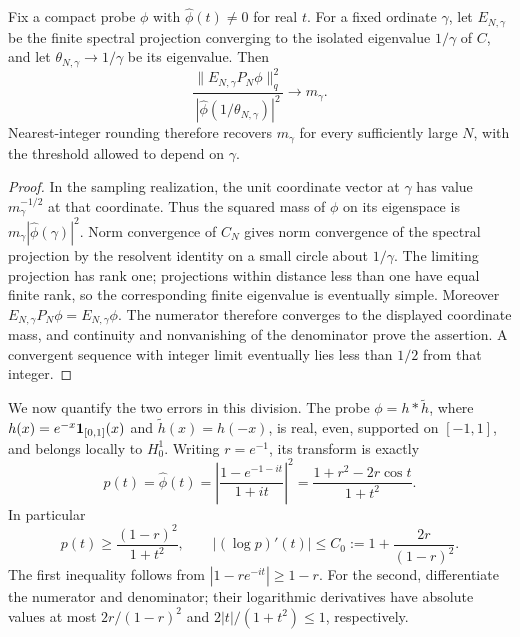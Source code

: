 \begin{remark}
\label{rem:suzuki-multiplicity}
Fix a compact probe $\phi$ with $\widehat\phi(t)\ne0$ for real $t$.
For a fixed ordinate $\gamma$, let $E_{N,\gamma}$ be the finite spectral
projection converging to the isolated eigenvalue $1/\gamma$ of $C$, and
let $\theta_{N,\gamma}\to1/\gamma$ be its eigenvalue. Then
\[
 \frac{\|E_{N,\gamma}P_N\phi\|_q^2}
      {|\widehat\phi(1/\theta_{N,\gamma})|^2}
           \longrightarrow m_\gamma.
\]
Nearest-integer rounding therefore recovers $m_\gamma$ for every
sufficiently large $N$, with the threshold allowed to depend on $\gamma$.
\end{remark}

\begin{proof}
In the sampling realization, the unit coordinate vector at $\gamma$ has
value $m_\gamma^{-1/2}$ at that coordinate. Thus the squared mass of
$\phi$ on its eigenspace is
$m_\gamma|\widehat\phi(\gamma)|^2$. Norm convergence of $C_N$ gives
norm convergence of the spectral projection by the resolvent identity
on a small circle about $1/\gamma$. The limiting projection has rank
one; projections within distance less than one have equal finite rank,
so the corresponding finite eigenvalue is eventually simple.
Moreover $E_{N,\gamma}P_N\phi=E_{N,\gamma}\phi$.
The numerator therefore converges to the displayed coordinate mass,
and continuity and nonvanishing of the denominator prove the assertion.
A convergent sequence with integer limit eventually lies less than
$1/2$ from that integer.
\end{proof}

We now quantify the two errors in this division. The probe
$\phi=h*\widetilde h$, where
$h(x)=e^{-x}{\bf1}_{[0,1]}(x)$ and $\widetilde h(x)=h(-x)$, is real,
even, supported on $[-1,1]$, and belongs locally to $H^1_0$.
Writing $r=e^{-1}$, its transform is exactly
\[
 p(t)=\widehat\phi(t)
 =\left|\frac{1-e^{-1-it}}{1+it}\right|^2
 =\frac{1+r^2-2r\cos t}{1+t^2}.
\]
In particular
\begin{equation}
 p(t)\ge\frac{(1-r)^2}{1+t^2},\qquad
 |(\log p)'(t)|\le C_0:=1+\frac{2r}{(1-r)^2}.
 \label{eq:probe-bounds}
\end{equation}
The first inequality follows from $|1-re^{-it}|\ge1-r$. For the
second, differentiate the numerator and denominator; their logarithmic
derivatives have absolute values at most $2r/(1-r)^2$ and
$2|t|/(1+t^2)\le1$, respectively.

